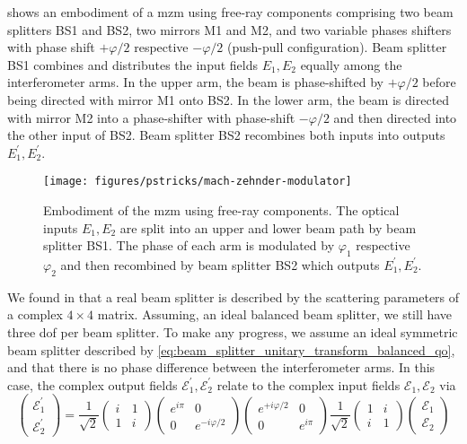  shows an embodiment of a \gls{mzm} using free-ray components comprising two beam splitters BS1 and BS2, two mirrors M1 and M2, and two variable phases shifters with phase shift $+\varphi/2$ respective $-\varphi/2$ (push-pull configuration).
Beam splitter BS1 combines and distributes the input fields $E_1,E_2$ equally among the interferometer arms.
In the upper arm, the beam is phase-shifted by $+\varphi/2$ before being directed with mirror M1 onto BS2.
In the lower arm, the beam is directed with mirror M2 into a phase-shifter with phase-shift $-\varphi/2$ and then directed into the other input of BS2.
Beam splitter BS2 recombines both inputs into outputs $E_1^\prime,E_2^\prime$.
\begin{figure}[htb]
    \centering
    \texttt{[image: figures/pstricks/mach-zehnder-modulator]}
    \caption{Embodiment of the \gls{mzm} using free-ray components. The optical inputs $E_1,E_2$ are split into an upper and lower beam path by beam splitter BS1. The phase of each arm is modulated by $\varphi_1$ respective $\varphi_2$ and then recombined by beam splitter BS2 which outputs $E_1^\prime,E_2^\prime$.}\label{fig:mach_zehnder_modulator}
\end{figure}
We found in  that a real beam splitter is described by the scattering parameters of a complex $4\times 4$ matrix.
Assuming, an ideal balanced beam splitter, we still have three \gls{dof} per beam splitter.
To make any progress, we assume an ideal symmetric beam splitter described by \cref{eq:beam_splitter_unitary_transform_balanced_qo}, and that there is no phase difference between the interferometer arms.
In this case, the complex output fields $\mathcal{E}_1^\prime,\mathcal{E}_2^\prime$ relate to the complex input fields $\mathcal{E}_1,\mathcal{E}_2$ via
\begin{equation}
    \begin{pmatrix}
        \mathcal{E}_1^\prime
        \\
        \mathcal{E}_2^\prime
    \end{pmatrix}
    =
    \frac{1}{\sqrt{2}}
    \begin{pmatrix}
        i & 1
        \\
        1 & i
    \end{pmatrix}
    \begin{pmatrix}
        e^{i\pi} & 0
        \\
        0 & e^{-i\varphi/2}
    \end{pmatrix}
        \begin{pmatrix}
        e^{+i\varphi/2} & 0
        \\
        0 & e^{i\pi}
    \end{pmatrix}
    \frac{1}{\sqrt{2}}
    \begin{pmatrix}
        1 & i
        \\
        i & 1
    \end{pmatrix}
    \begin{pmatrix}
        \mathcal{E}_1
        \\
        \mathcal{E}_2
    \end{pmatrix}
    \label{eq:mzm_transform}
\end{equation}
